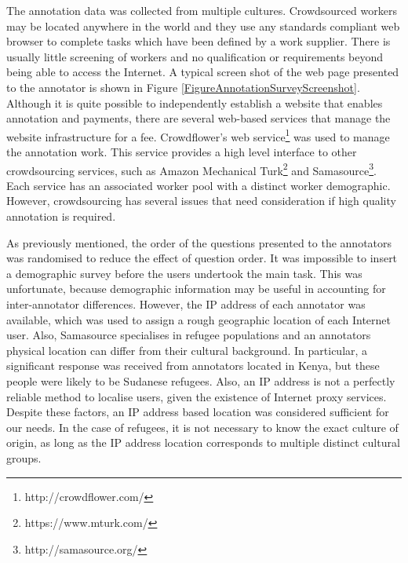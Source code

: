 The annotation data was collected from multiple cultures.
Crowdsourced workers may be located anywhere in the world and they use any standards compliant web browser to complete tasks which have been defined by a work supplier. There is usually little screening of workers and no qualification or requirements beyond being able to access the Internet. A typical screen shot of the web page presented to the annotator is shown in Figure \ref{FigureAnnotationSurveyScreenshot}. Although it is quite possible to independently establish a website that enables annotation and payments, there are several web-based services that manage the website infrastructure for a fee. Crowdflower's web service\footnote{\scriptsize{http://crowdflower.com/}} was used to manage the annotation work. This service provides a high level interface to other crowdsourcing services, such as Amazon Mechanical Turk\footnote{\scriptsize{https://www.mturk.com/}} and Samasource\footnote{\scriptsize{http://samasource.org/}}. Each service has an associated worker pool with a distinct worker demographic. However, crowdsourcing has several issues that need consideration if high quality annotation is required.

As previously mentioned, the order of the questions presented to the annotators was randomised to reduce the effect of question order. It was impossible to insert a demographic survey before the users undertook the main task. This was unfortunate, because demographic information may be useful in accounting for inter-annotator differences. However, the IP address of each annotator was available, which was used to assign a rough geographic location of each Internet user. Also, Samasource specialises in refugee populations and an annotators physical location can differ from their cultural background. In particular, a significant response was received from annotators located in Kenya, but these people were likely to be Sudanese refugees. Also, an IP address is not a perfectly reliable method to localise users, given the existence of Internet proxy services. Despite these factors, an IP address based location was considered sufficient for our needs. In the case of refugees, it is not necessary to know the exact culture of origin, as long as the IP address location corresponds to multiple distinct cultural groups. 

